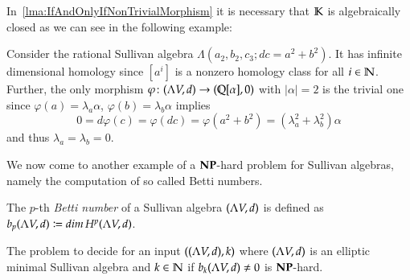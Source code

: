  \begin{Remark}
  In~\ref{lma:IfAndOnlyIfNonTrivialMorphism} it is necessary that $\mathbb{K}$ is algebraically closed 
  as we can see in the following example: 
  
  Consider the rational Sullivan algebra
  $\Lambda(a_2, b_2, c_3; dc = a^2 + b^2)$. It has infinite dimensional homology since $ [a^i]$ is a nonzero homology
  class for all $i \in \mathbb{N}$. Further, the only morphism $\varphi \colon (\Lambda V,d) \to (\mathbb{Q}[\alpha], 0)$ with $|\alpha| = 2$ is the
  trivial one since $\varphi (a) = \lambda_a \alpha$, $\varphi (b) = \lambda_b \alpha$ implies 
  $$ 0 = d\varphi (c) = \varphi(dc) = \varphi( a^2 + b^2) = (\lambda_a^2 + \lambda_b^2) \alpha$$ and thus
  $\lambda_a = \lambda_b = 0$.
  
 \end{Remark}
  
 
 We now come to another example of a $\mathbf{NP}$-hard problem for Sullivan algebras, namely the computation
 of so called Betti numbers.
 
 \begin{Definition}
  The $p$-th \emph{Betti number} of a Sullivan algebra $(\Lambda V,d)$ is defined as  
  $b_p (\Lambda V,d) \coloneqq dim \, H^p (\Lambda V,d)$.
 \end{Definition}


 \begin{Theorem}
\label{thm:AlgebrasBettiNumbersLemma}
  The problem to decide for an input $((\Lambda V,d),k)$ where $(\Lambda V,d)$ is an elliptic minimal Sullivan algebra 
  and $k \in \mathbb{N}$ if $b_k (\Lambda V,d) \neq 0$ is $\mathbf{NP}$-hard.
 \end{Theorem}

